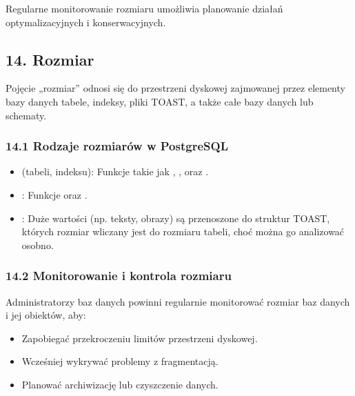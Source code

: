 \documentclass[letterpaper,10pt,polish]{sphinxmanual}
\begin{document}
\sphinxAtStartPar
Regularne monitorowanie rozmiaru umożliwia planowanie działań optymalizacyjnych i konserwacyjnych.


\subsection{14. Rozmiar}
\label{\detokenize{rozdzial2/Konfiguracja_baz_danych/Konfiguracja_baz_danych:rozmiar}}
\sphinxAtStartPar
Pojęcie „rozmiar” odnosi się do przestrzeni dyskowej zajmowanej przez elementy bazy danych \textendash{} tabele, indeksy, pliki TOAST, a także całe bazy danych lub schematy.


\subsubsection{14.1 Rodzaje rozmiarów w PostgreSQL}
\label{\detokenize{rozdzial2/Konfiguracja_baz_danych/Konfiguracja_baz_danych:rodzaje-rozmiarow-w-postgresql}}\begin{itemize}
\item {} 
\sphinxAtStartPar
{} (tabeli, indeksu):
Funkcje takie jak , ,  oraz .

\item {} 
\sphinxAtStartPar
{}:
Funkcje  oraz .

\item {} 
\sphinxAtStartPar
{}:
Duże wartości (np. teksty, obrazy) są przenoszone do struktur TOAST, których rozmiar wliczany jest do rozmiaru tabeli, choć można go analizować osobno.

\end{itemize}


\subsubsection{14.2 Monitorowanie i kontrola rozmiaru}
\label{\detokenize{rozdzial2/Konfiguracja_baz_danych/Konfiguracja_baz_danych:monitorowanie-i-kontrola-rozmiaru}}
\sphinxAtStartPar
Administratorzy baz danych powinni regularnie monitorować rozmiar baz danych i jej obiektów, aby:
\begin{itemize}
\item {} 
\sphinxAtStartPar
Zapobiegać przekroczeniu limitów przestrzeni dyskowej.

\item {} 
\sphinxAtStartPar
Wcześniej wykrywać problemy z fragmentacją.

\item {} 
\sphinxAtStartPar
Planować archiwizację lub czyszczenie danych.

\end{itemize}
\end{document}
